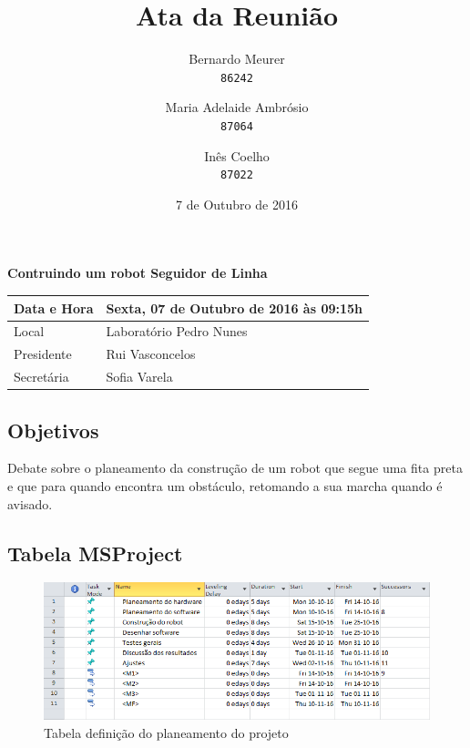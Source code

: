 \documentclass{article}
\title{Ata da Reunião}
\date{7 de Outubro de 2016}
\author{Bernardo Meurer\\
        \texttt{86242}
        \and
        Maria Adelaide Ambrósio\\
        \texttt{87064}
        \and
        Inês Coelho\\
        \texttt{87022}}
\begin{document}
\maketitle
\newpage

\begin{center}
\textbf{Contruindo um robot Seguidor de Linha}
\end{center}
\begin{table}[h]
\centering
\begin{tabular}{@{}ll@{}}
Data e Hora & Sexta,  07 de Outubro de 2016 às 09:15h \\ \toprule
Local       & Laboratório Pedro Nunes                \\ \midrule
Presidente  & Rui Vasconcelos                        \\ \midrule
Secretária  & Sofia Varela                            \\ \bottomrule
\end{tabular}
\end{table}
\subsection*{Objetivos}
Debate sobre o planeamento da construção de um robot que segue uma fita preta e
que para quando encontra um obstáculo, retomando a sua marcha quando é avisado.

\subsection*{Tabela MSProject}
\begin{figure}[H]
    \centering
    \includegraphics[scale=.8]{geral}
    \caption{Tabela definição do planeamento do projeto}
\end{figure}
\end{document}
